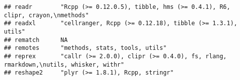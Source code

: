 \documentclass[]{book}
\begin{document}
\begin{verbatim}
## readr        "Rcpp (>= 0.12.0.5), tibble, hms (>= 0.4.1), R6, clipr, crayon,\nmethods"                                                                                                                                                                                                                                                                                                                                                                                                                                   
## readxl       "cellranger, Rcpp (>= 0.12.18), tibble (>= 1.3.1), utils"                                                                                                                                                                                                                                                                                                                                                                                                                                                   
## rematch      NA                                                                                                                                                                                                                                                                                                                                                                                                                                                                                                          
## remotes      "methods, stats, tools, utils"                                                                                                                                                                                                                                                                                                                                                                                                                                                                              
## reprex       "callr (>= 2.0.0), clipr (>= 0.4.0), fs, rlang, rmarkdown,\nutils, whisker, withr"                                                                                                                                                                                                                                                                                                                                                                                                                          
## reshape2     "plyr (>= 1.8.1), Rcpp, stringr"                                                                                                                                                                                                                                                                                                                                                                                                                                                                            

\end{verbatim}
\end{document}
